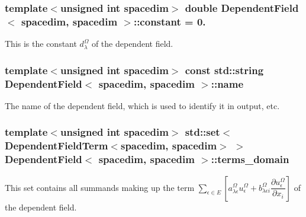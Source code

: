 \subsubsection[{\texorpdfstring{constant}{constant}}]{\setlength{\rightskip}{0pt plus 5cm}template$<$unsigned int spacedim$>$ double {\bf Dependent\+Field}$<$ spacedim, spacedim $>$\+::constant = 0.\hspace{0.3cm}{\ttfamily [private]}}\hypertarget{class_dependent_field_3_01spacedim_00_01spacedim_01_4_a24efc9c0928896be871908f050c406fc}{}\label{class_dependent_field_3_01spacedim_00_01spacedim_01_4_a24efc9c0928896be871908f050c406fc}
This is the constant $d^\Omega_\lambda$ of the dependent field. 
\subsubsection[{\texorpdfstring{name}{name}}]{\setlength{\rightskip}{0pt plus 5cm}template$<$unsigned int spacedim$>$ const std\+::string {\bf Dependent\+Field}$<$ spacedim, spacedim $>$\+::name}\hypertarget{class_dependent_field_3_01spacedim_00_01spacedim_01_4_a99a47f4c10f0e472dbdc2b0945712e23}{}\label{class_dependent_field_3_01spacedim_00_01spacedim_01_4_a99a47f4c10f0e472dbdc2b0945712e23}
The name of the dependent field, which is used to identify it in output, etc. 
\subsubsection[{\texorpdfstring{terms\+\_\+domain}{terms_domain}}]{\setlength{\rightskip}{0pt plus 5cm}template$<$unsigned int spacedim$>$ std\+::set$<${\bf Dependent\+Field\+Term}$<$spacedim, spacedim$>$ $>$ {\bf Dependent\+Field}$<$ spacedim, spacedim $>$\+::terms\+\_\+domain\hspace{0.3cm}{\ttfamily [private]}}\hypertarget{class_dependent_field_3_01spacedim_00_01spacedim_01_4_ace23fb05e85b4c967793e8ffce58f332}{}\label{class_dependent_field_3_01spacedim_00_01spacedim_01_4_ace23fb05e85b4c967793e8ffce58f332}
This set contains all summands making up the term $\sum_{\epsilon \in E} \left[ a^\Omega_{\lambda\epsilon} u^\Omega_\epsilon + b^\Omega_{\lambda \epsilon i} \dfrac{\partial u^\Omega_\epsilon}{\partial x_i} \right]$ of the dependent field. 
